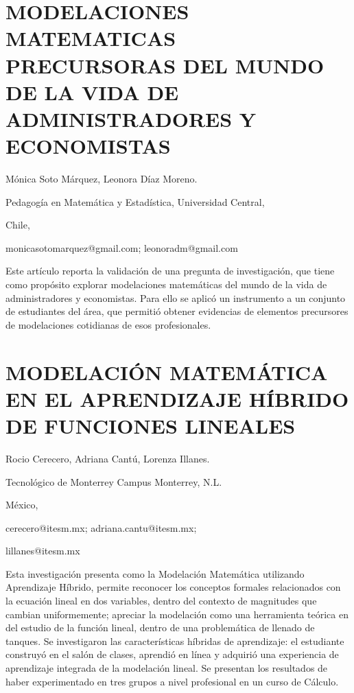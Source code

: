 \section{MODELACIONES MATEMATICAS PRECURSORAS DEL MUNDO DE LA VIDA DE ADMINISTRADORES
Y ECONOMISTAS}

\begin{datos}

Mónica Soto Márquez, Leonora Díaz Moreno.

Pedagogía en Matemática y Estadística, Universidad Central,

Chile,

monicasotomarquez@gmail.com; leonoradm@gmail.com 

\end{datos}

Este artículo reporta la validación de una pregunta de investigación,
que tiene como propósito explorar modelaciones matemáticas del mundo
de la vida de administradores y economistas. Para ello se aplicó un
instrumento a un conjunto de estudiantes del área, que permitió obtener
evidencias de elementos precursores de modelaciones cotidianas de
esos profesionales. 


\section{\uppercase{ MODELACIÓN Matemática EN EL APRENDIZAJE HÍBRIDO de funciones
lineales }}

\begin{datos}

Rocio Cerecero, Adriana Cantú, Lorenza Illanes. 

Tecnológico de Monterrey Campus Monterrey, N.L.

México,

cerecero@itesm.mx; adriana.cantu@itesm.mx;

lillanes@itesm.mx

\end{datos}

Esta investigación presenta como la Modelación Matemática utilizando
Aprendizaje Híbrido, permite reconocer los conceptos formales relacionados
con la ecuación lineal en dos variables, dentro del contexto de magnitudes
que cambian uniformemente; apreciar la modelación como una herramienta
teórica en del estudio de la función lineal, dentro de una problemática
de llenado de tanques. Se investigaron las características híbridas
de aprendizaje: el estudiante construyó en el salón de clases, aprendió
en línea y adquirió una experiencia de aprendizaje integrada de la
modelación lineal. Se presentan los resultados de haber experimentado
en tres grupos a nivel profesional en un curso de Cálculo.


